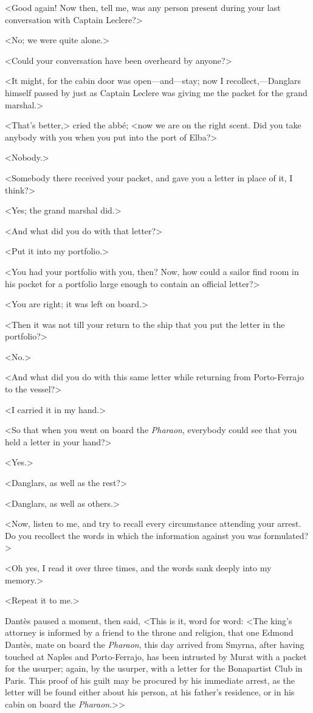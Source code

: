  <Good again! Now then, tell me, was any person present during your last conversation with Captain Leclere?> 

 <No; we were quite alone.> 

 <Could your conversation have been overheard by anyone?> 

 <It might, for the cabin door was open—and—stay; now I recollect,—Danglars himself passed by just as Captain Leclere was giving me the packet for the grand marshal.> 

 <That's better,> cried the abbé; <now we are on the right scent. Did you take anybody with you when you put into the port of Elba?> 

 <Nobody.> 

 <Somebody there received your packet, and gave you a letter in place of it, I think?> 

 <Yes; the grand marshal did.> 

 <And what did you do with that letter?> 

 <Put it into my portfolio.> 

 <You had your portfolio with you, then? Now, how could a sailor find room in his pocket for a portfolio large enough to contain an official letter?> 

 <You are right; it was left on board.> 

 <Then it was not till your return to the ship that you put the letter in the portfolio?> 

 <No.> 

 <And what did you do with this same letter while returning from Porto-Ferrajo to the vessel?> 

 <I carried it in my hand.> 

 <So that when you went on board the \textit{Pharaon}, everybody could see that you held a letter in your hand?> 

 <Yes.> 

 <Danglars, as well as the rest?> 

 <Danglars, as well as others.> 

 <Now, listen to me, and try to recall every circumstance attending your arrest. Do you recollect the words in which the information against you was formulated?> 

 <Oh yes, I read it over three times, and the words sank deeply into my memory.> 

 <Repeat it to me.> 

 Dantès paused a moment, then said, <This is it, word for word: <The king's attorney is informed by a friend to the throne and religion, that one Edmond Dantès, mate on board the \textit{Pharaon}, this day arrived from Smyrna, after having touched at Naples and Porto-Ferrajo, has been intrusted by Murat with a packet for the usurper; again, by the usurper, with a letter for the Bonapartist Club in Paris. This proof of his guilt may be procured by his immediate arrest, as the letter will be found either about his person, at his father's residence, or in his cabin on board the \textit{Pharaon}.>> 

